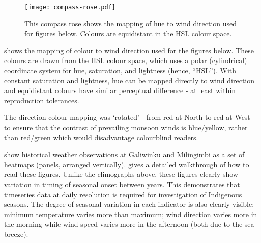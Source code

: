 \begin{wrapfigure}{r}{0.5\textwidth}
    \texttt{[image: compass-rose.pdf]}
    \caption[Compass Rose mapping colour to wind direction]{
        This compass rose shows the mapping of hue to wind direction used
        for figures below.  Colours are equidistant in the HSL colour space.
        }
    \label{fig:compass-rose}
\end{wrapfigure}

 shows the mapping of colour to wind direction used
for the figures below.  These colours are drawn from the HSL colour space,
which uses a polar (cylindrical) coordinate system for hue, saturation,
and lightness (hence, ``HSL'').  With constant saturation and lightness,
hue can be mapped directly to wind direction and equidistant colours
have similar perceptual difference - at least within reproduction tolerances.

The direction-colour mapping was `rotated' - from red at North to red at West -
to ensure that the contrast of prevailing monsoon winds is blue/yellow,
rather than red/green which would disadvantage colourblind readers.

show historical weather observations at Galiwinku and Milingimbi as a set of
heatmaps (panels, arranged vertically).  
gives a detailed walkthrough of how to read these figures.
%
Unlike the climographs above, these figures clearly show variation in timing
of seasonal onset between years.  This demonstrates that timeseries data
at daily resolution is required for investigation of Indigenous seasons.
%
The degree of seasonal variation in each indicator is also clearly visible:
minimum temperature varies more than maximum; wind direction varies more in
the morning while wind speed varies more in the afternoon (both due to the
sea breeze).


%

